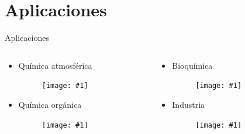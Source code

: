 \documentclass[handout]{beamer}
\newcommand{\cfigure}[2]
{
	\begin{figure}
		\centering
		\texttt{[image: \#1]}
	\end{figure}
}
\begin{document}
\section{Aplicaciones}
\begin{frame}{Aplicaciones}
    \begin{columns}
        \begin{column}{0.5\textwidth}
            \begin{itemize}
                \item Qu\'imica atmosf\'erica
                \cfigure{sources/clouds.jpg}{0.8\linewidth}
                \item Qu\'imica org\'anica
                \cfigure{sources/hydrogenation.png}{0.8\linewidth}
            \end{itemize}
        \end{column}
        \begin{column}{0.5\textwidth}
            \begin{itemize}
                \item Bioqu\'imica
                \cfigure{sources/enzymatic.jpg}{0.8\linewidth}
                \item Industria
                \cfigure{sources/industry.jpg}{\linewidth}
            \end{itemize}
        \end{column}
    \end{columns}
\end{frame}
\end{document}
